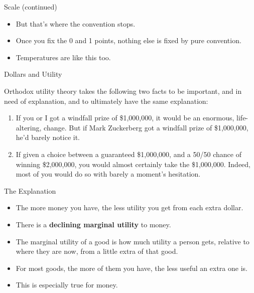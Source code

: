 \documentclass[
  ignorenonframetext,
]{beamer}
\providecommand{\tightlist}{%
  \setlength{\itemsep}{0pt}\setlength{\parskip}{0pt}}
\renewcommand{\,}{\text{, }}
\begin{document}
\begin{frame}{Scale (continued)}
\protect\hypertarget{scale-continued}{}

\begin{itemize}
\tightlist
\item
  But that's where the convention stops.
\item
  Once you fix the 0 and 1 points, nothing else is fixed by pure
  convention.
\item
  Temperatures are like this too.
\end{itemize}

\end{frame}

\begin{frame}{Dollars and Utility}
\protect\hypertarget{dollars-and-utility}{}

Orthodox utility theory takes the following two facts to be important,
and in need of explanation, and to ultimately have the same explanation:

\begin{enumerate}
\tightlist
\item
  If you or I got a windfall prize of \$1,000,000, it would be an
  enormous, life-altering, change. But if Mark Zuckerberg got a windfall
  prize of \$1,000,000, he'd barely notice it.
\item
  If given a choice between a guaranteed \$1,000,000, and a 50/50 chance
  of winning \$2,000,000, you would almost certainly take the
  \$1,000,000. Indeed, most of you would do so with barely a moment's
  hesitation.
\end{enumerate}

\end{frame}

\begin{frame}{The Explanation}
\protect\hypertarget{the-explanation}{}

\begin{itemize}
\tightlist
\item
  The more money you have, the less utility you get from each extra
  dollar.
\item
  There is a \textbf{declining marginal utility} to money.
\item
  The marginal utility of a good is how much utility a person gets,
  relative to where they are now, from a little extra of that good.
\item
  For most goods, the more of them you have, the less useful an extra
  one is.
\item
  This is especially true for money.
\end{itemize}

\end{frame}
\end{document}
